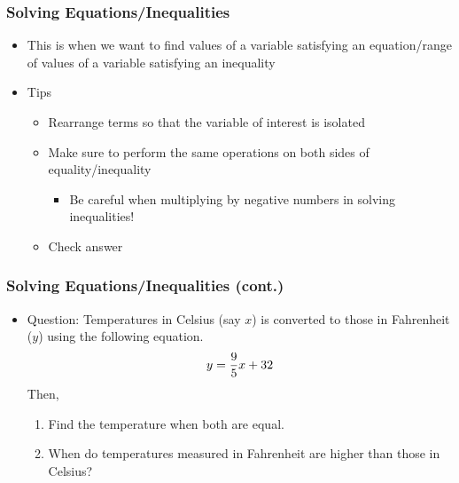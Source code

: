 \documentclass[pdflatex, 12pt]{beamer}
\begin{document}
\begin{frame}
\frametitle{Solving Equations/Inequalities}
\begin{itemize}
\item This is when we want to find values of a variable satisfying an equation/range of values of a variable satisfying an inequality
\vspace{0.4cm}
\item Tips
 \begin{itemize}
 \item Rearrange terms so that the variable of interest is isolated
 \item Make sure to perform the same operations on both sides of equality/inequality
  \begin{itemize}
  \item Be careful when multiplying by negative numbers in solving inequalities!
  \end{itemize}
 \item Check answer
 \end{itemize}
\end{itemize}
\end{frame}

\begin{frame}
\frametitle{Solving Equations/Inequalities (cont.)}
\begin{itemize}
\item Question: Temperatures in Celsius (say $x$) is converted to those in Fahrenheit ($y$) using the following equation.
 \begin{equation}
 y = \frac{9}{5}x + 32 \notag
 \end{equation} 
Then,
 \begin{enumerate}
 \item Find the temperature when both are equal.
 \item When do temperatures measured in Fahrenheit are higher than those in Celsius?
 \end{enumerate}
\end{itemize}
\end{frame}
\end{document}
